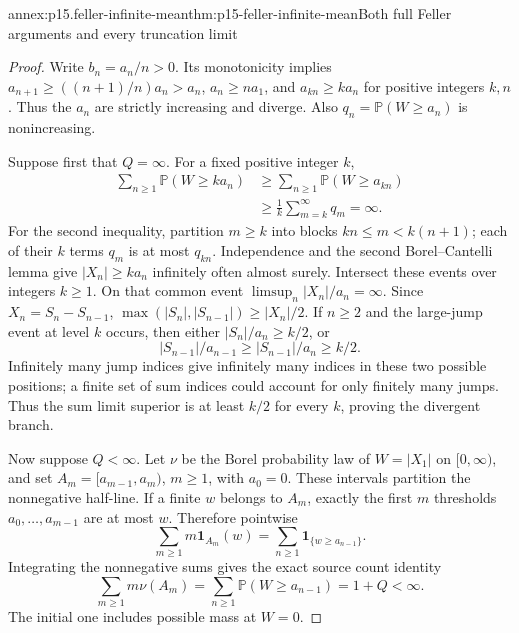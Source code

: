 \begin{annexitem}{annex:p15.feller-infinite-mean}{thm:p15-feller-infinite-mean}{Both full Feller arguments and every truncation limit}
\begin{proof}
Write \(b_n=a_n/n>0\). Its monotonicity implies
\(a_{n+1}\geq((n+1)/n)a_n>a_n\), \(a_n\geq n a_1\),
and \(a_{kn}\geq k a_n\) for positive integers \(k,n\).
Thus the \(a_n\) are strictly increasing and diverge.
Also \(q_n=\mathbb P(W\geq a_n)\) is nonincreasing.

Suppose first that \(Q=\infty\). For a fixed positive integer \(k\),
\[
 \begin{aligned}
 \sum_{n\geq1}\mathbb P(W\geq k a_n)
 &\geq\sum_{n\geq1}\mathbb P(W\geq a_{kn})\\
 &\geq\frac1k\sum_{m=k}^\infty q_m=\infty.
 \end{aligned}
\]
For the second inequality, partition \(m\geq k\) into blocks
\(kn\leq m<k(n+1)\); each of their \(k\) terms \(q_m\) is at
most \(q_{kn}\). Independence and the second Borel--Cantelli lemma
give \(|X_n|\geq k a_n\) infinitely often almost surely.
Intersect these events over integers \(k\geq1\). On that common
event \(\limsup_n|X_n|/a_n=\infty\).
Since \(X_n=S_n-S_{n-1}\),
\(\max(|S_n|,|S_{n-1}|)\geq|X_n|/2\).
If \(n\geq2\) and the large-jump event at level \(k\) occurs,
then either \(|S_n|/a_n\geq k/2\), or
\[
 |S_{n-1}|/a_{n-1}\geq|S_{n-1}|/a_n\geq k/2.
\]
Infinitely many jump indices give infinitely many indices in these
two possible positions; a finite set of sum indices could account
for only finitely many jumps. Thus the sum limit superior is at
least \(k/2\) for every \(k\), proving the divergent branch.

Now suppose \(Q<\infty\). Let \(\nu\) be the Borel probability
law of \(W=|X_1|\) on \([0,\infty)\), and set
\(A_m=[a_{m-1},a_m)\), \(m\geq1\), with \(a_0=0\).
These intervals partition the nonnegative half-line. If a finite
\(w\) belongs to \(A_m\), exactly the first \(m\) thresholds
\(a_0,\ldots,a_{m-1}\) are at most \(w\). Therefore pointwise
\[
 \sum_{m\geq1}m\mathbf1_{A_m}(w)
       =\sum_{n\geq1}\mathbf1_{\{w\geq a_{n-1}\}}.
\]
Integrating the nonnegative sums gives the exact source count identity
\[
 \sum_{m\geq1}m\nu(A_m)=
       \sum_{n\geq1}\mathbb P(W\geq a_{n-1})=1+Q<\infty.
\]
The initial one includes possible mass at \(W=0\).


\end{proof}
\end{annexitem}
